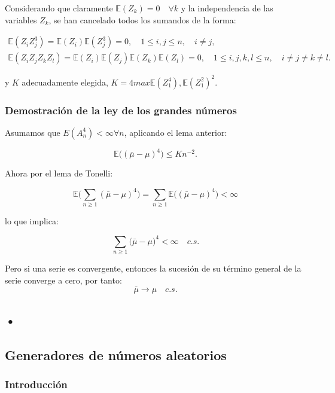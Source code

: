 \documentclass[../proyecto.tex]{memoir}
\begin{document}
Considerando que claramente $\mathds{E}(Z_k)=0 \quad \forall k$ y la independencia de las variables $Z_k$, se han cancelado todos los sumandos de la forma:

\begin{align*}
	\mathds{E} (Z_{i} Z_{j}^3 ) =\mathds{E} (Z_{i}) \mathds{E} (Z_{j}^3) = 0, \quad 1 \leq i,j \leq n, \quad i \neq j, \\
	\mathds{E} ( Z_{i} Z_{j} Z_{k} Z_{l} ) = \mathds{E} (Z_{i}) \mathds{E} (Z_{j}) \mathds{E} (Z_{k}) \mathds{E} (Z_{l}) = 0, \quad 1 \leq i,j,k,l \leq n, \quad i \neq j \neq k \neq l.
\end{align*}

y $K$ adecuadamente elegida, $K = 4 max{\mathds{E}(Z_1^4), \mathds{E}(Z_1^2)^2}$.

\subsubsection{Demostración de la ley de los grandes números}

Asumamos que $E(A_n^4) < \infty \forall n$, aplicando el lema anterior:

$$
	\mathds{E} \big( ( \bar{ \mu } - \mu ) ^ 4 \big) \leq K n^{-2}.
$$

Ahora por el lema de Tonelli:

$$
	\mathds{E} \big( \sum_{n \geq 1}( \bar{ \mu } - \mu ) ^ 4 \big) = \sum_{n \geq 1} \mathds{E} \big( ( \bar{ \mu } - \mu ) ^ 4 \big)  < \infty
$$

lo que implica:

$$
\sum_{n \geq 1} \big( \bar{ \mu } - \mu \big)^ 4 < \infty \quad c.s. 
$$

Pero si una serie es convergente, entonces la sucesión de su término general de la serie converge a cero, por tanto:
$$
 \bar{ \mu } \to \mu \quad c.s.
$$
% 

\subsection{•}


\subsection{Generadores de números aleatorios}

\subsubsection{Introducción}
\end{document}
